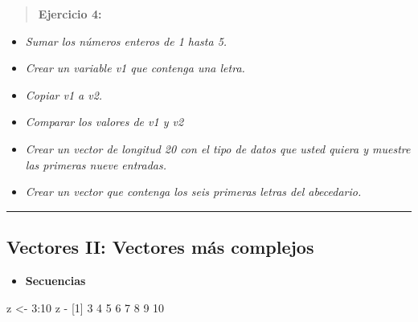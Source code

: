 \documentclass[
]{book}
\newenvironment{Shaded}{\begin{snugshade}}{\end{snugshade}}
\newcommand{\DecValTok}[1]{\textcolor[rgb]{0.00,0.00,0.81}{#1}}
\newcommand{\NormalTok}[1]{#1}
\newcommand{\OtherTok}[1]{\textcolor[rgb]{0.56,0.35,0.01}{#1}}
\newcommand{\SpecialCharTok}[1]{\textcolor[rgb]{0.00,0.00,0.00}{#1}}
\providecommand{\tightlist}{%
  \setlength{\itemsep}{0pt}\setlength{\parskip}{0pt}}
\begin{document}
\begin{quote}
\textbf{Ejercicio 4:}
\end{quote}

\begin{itemize}
\item
  \emph{Sumar los números enteros de 1 hasta 5.}
\item
  \emph{Crear un variable v1 que contenga una letra.}
\item
  \emph{Copiar v1 a v2.}
\item
  \emph{Comparar los valores de v1 y v2}
\item
  \emph{Crear un vector de longitud 20 con el tipo de datos que usted quiera y muestre las primeras nueve entradas.}
\item
  \emph{Crear un vector que contenga los seis primeras letras del abecedario.}
\end{itemize}

\begin{center}\rule{0.5\linewidth}{0.5pt}\end{center}

\hypertarget{vectores-ii-vectores-muxe1s-complejos}{%
\subsection{Vectores II: Vectores más complejos}\label{vectores-ii-vectores-muxe1s-complejos}}

\begin{itemize}
\tightlist
\item
  \textbf{Secuencias}
\end{itemize}

\begin{Shaded}
\begin{Highlighting}[]
\NormalTok{z }\OtherTok{\textless{}{-}} \DecValTok{3}\SpecialCharTok{:}\DecValTok{10}
\NormalTok{z}
\SpecialCharTok{{-}}\NormalTok{ [}\DecValTok{1}\NormalTok{]  }\DecValTok{3}  \DecValTok{4}  \DecValTok{5}  \DecValTok{6}  \DecValTok{7}  \DecValTok{8}  \DecValTok{9} \DecValTok{10}
\end{Highlighting}
\end{Shaded}
\end{document}
